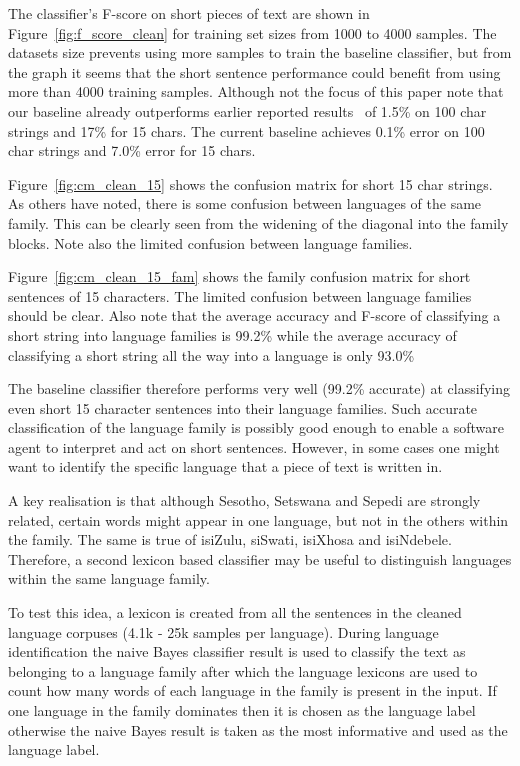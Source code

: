 \documentclass[conference]{IEEEtran}
\begin{document}
The classifier's F-score on short pieces of text are shown in Figure~\ref{fig:f_score_clean} for training set sizes from 1000 to 4000 samples. The datasets size prevents using more samples to train the baseline classifier, but from the graph it seems that the short sentence performance could benefit from using more than 4000 training samples. Although not the focus of this paper note that our baseline already outperforms earlier reported results~\cite{BothaBarnard2012} of 1.5\% on 100 char strings and 17\% for 15 chars. The current baseline achieves 0.1\% error on 100 char strings and 7.0\% error for 15 chars.

 

Figure~\ref{fig:cm_clean_15} shows the confusion matrix for short 15 char strings. As others have noted, there is some confusion between languages of the same family. This can be clearly seen from the widening of the diagonal into the family blocks. Note also the limited confusion between language families.

Figure~\ref{fig:cm_clean_15_fam} shows the family confusion matrix for short sentences of 15 characters. The limited confusion between language families should be clear. Also note that the average accuracy and F-score of classifying a short string into language families is 99.2\% while the average accuracy of classifying a short string all the way into a language is only 93.0\%

The baseline classifier therefore performs very well (99.2\% accurate) at classifying even short 15 character sentences into their language families. Such accurate classification of the language family is possibly good enough to enable a software agent to interpret and act on short sentences. However, in some cases one might want to identify the specific language that a piece of text is written in.

A key realisation is that although Sesotho, Setswana and Sepedi are strongly related, certain words might appear in one language, but not in the others within the family. The same is true of isiZulu, siSwati, isiXhosa and isiNdebele. Therefore, a second lexicon based classifier may be useful to distinguish languages within the same language family.

To test this idea, a lexicon is created from all the sentences in the cleaned language corpuses (4.1k - 25k samples per language). During language identification the naive Bayes classifier result is used to classify the text as belonging to a language family after which the language lexicons are used to count how many words of each language in the family is present in the input. If one language in the family dominates then it is chosen as the language label otherwise the naive Bayes result is taken as the most informative and used as the language label.
\end{document}
